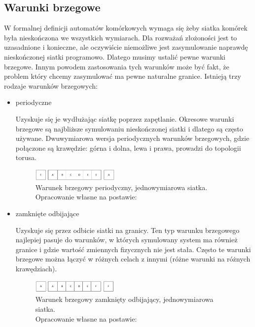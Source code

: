 \documentclass{sprawozdanie-agh}
\begin{document}
			\subsection{Warunki brzegowe}

			W formalnej definicji automatów komórkowych wymaga się żeby siatka komórek była nieskończona we wszystkich wymiarach. Dla rozważań złożoności jest to uzasadnione i konieczne, ale oczywiście niemożliwe jest zasymulowanie naprawdę nieskończonej siatki programowo. Dlatego musimy ustalić pewne warunki brzegowe. Innym powodem zastosowania tych warunków może być fakt, że problem który chcemy zasymulować ma pewne naturalne granice. Istnieją trzy rodzaje warunków brzegowych:

			\begin{itemize}
				\item periodyczne
				
				Uzyskuje się je wydłużając siatkę poprzez zapętlanie. Okresowe warunki brzegowe są najbliższe symulowaniu nieskończonej siatki i dlatego są często używane. Dwuwymiarowa wersja periodycznych warunków brzegowych, gdzie połączone są krawędzie: górna i dolna, lewa i prawa, prowadzi do topologii torusa.

				\begin{figure}[H]
					\centering
					\captionsetup{justification=centering}
					  \includegraphics[width=0.4\textwidth]{periodic}
					\caption{Warunek brzegowy periodyczny, jednowymiarowa siatka. \\ Opracowanie własne na postawie: \cite{warunkiBrzegowe}}
					\label{fig:periodic}
				\end{figure}

				\item zamknięte odbijające
				
				Uzyskuje się przez odbicie siatki na granicy. Ten typ warunku brzegowego najlepiej pasuje do warunków, w których symulowany system ma również granice i gdzie wartość zmiennych fizycznych nie jest stała. Często te warunki brzegowe można łączyć w różnych celach z innymi (różne warunki na różnych krawędziach).

				\begin{figure}[H]
					\centering
					\captionsetup{justification=centering}
					  \includegraphics[width=0.4\textwidth]{zamknieteOdb}
					\caption{Warunek brzegowy zamknięty odbijający, jednowymiarowa siatka. \\ Opracowanie własne na postawie: \cite{warunkiBrzegowe}}
					\label{fig:closedOdb}
				\end{figure}


\end{itemize}
\end{document}
